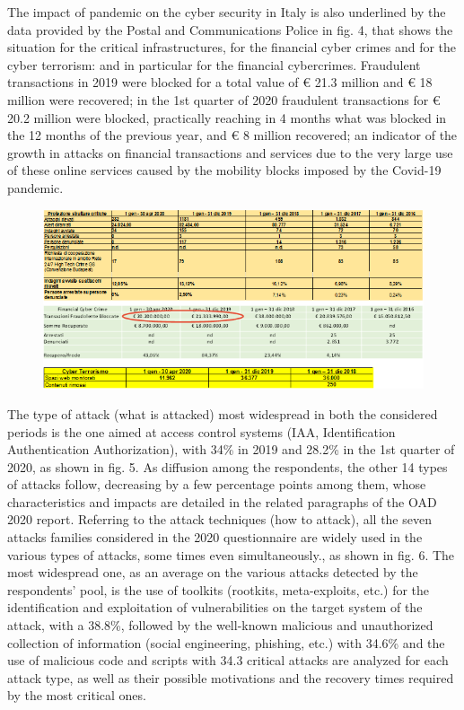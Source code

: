\documentclass{easychair}
\begin{document}
The impact of pandemic on the cyber security in Italy is also underlined by the data  provided by the Postal and Communications Police in fig. 4, that shows the situation for the
critical infrastructures, for the financial cyber crimes and for the cyber terrorism: and in particular for the financial cybercrimes. Fraudulent transactions in 2019 were blocked
for a total value of € 21.3 million and € 18 million were recovered; in the 1st quarter of 2020 fraudulent transactions for € 20.2 million were blocked, practically 
reaching in 4 months what was blocked in the 12 months of the previous year, and € 8 million recovered; an indicator of the growth in attacks on financial transactions and 
services due to the very large use of these online services caused by the mobility blocks imposed by the Covid-19 pandemic.


\begin{figure}
	\centering
		\includegraphics[width=1\textwidth]{pictures/fig4.png}
		\caption{}
		\label{fig:4}
\end{figure}


The type of attack (what is attacked) most widespread in both the considered periods is the one aimed at access control systems (IAA, Identification Authentication Authorization), 
with 34\% in 2019 and 28.2\% in the 1st quarter of 2020, as shown in fig. 5. As diffusion among the respondents, the other 14 types of attacks follow, decreasing by a few percentage
points among them, whose characteristics and impacts are detailed in the related paragraphs of the OAD 2020 report. Referring to the attack techniques (how to attack), all the seven
attacks families considered in the 2020 questionnaire are widely used in the various types of attacks, some times even simultaneously., as shown in fig. 6. The most widespread one,
as an average on the various attacks detected by the respondents’ pool, is the use of toolkits (rootkits, meta-exploits, etc.) for the identification and exploitation of vulnerabilities
on the target system of the attack, with a 38.8\%, followed by the well-known malicious and unauthorized collection of information (social engineering, phishing, etc.) with 34.6\% 
and the use of malicious code and scripts with 34.3%
critical attacks are analyzed for each attack type, as well as their possible motivations and the recovery times required by the most critical ones.
\end{document}

